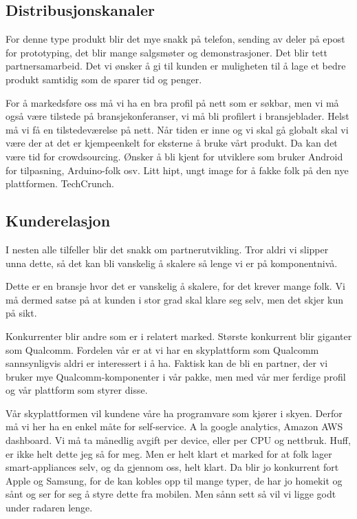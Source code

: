 
\subsection{Distribusjonskanaler}

For denne type produkt blir det mye snakk på telefon, sending av deler på epost
for prototyping, det blir mange salgsmøter og demonstrasjoner. Det blir tett
partnersamarbeid. Det vi ønsker å gi til kunden er muligheten til å lage et
bedre produkt samtidig som de sparer tid og penger.

For å markedsføre oss må vi ha en bra profil på nett som er søkbar, men vi må
også være tilstede på bransjekonferanser, vi må bli profilert i bransjeblader.
Helst må vi få en tilstedeværelse på nett. Når tiden er inne og vi skal gå
globalt skal vi være der at det er kjempeenkelt for eksterne å bruke vårt
produkt. Da kan det være tid for crowdsourcing. Ønsker å bli kjent for
utviklere som bruker Android for tilpasning, Arduino-folk osv. Litt hipt, ungt
image for å fakke folk på den nye plattformen. TechCrunch.

\subsection{Kunderelasjon}

I nesten alle tilfeller blir det snakk om partnerutvikling. Tror aldri vi
slipper unna dette, så det kan bli vanskelig å skalere så lenge vi er på
komponentnivå.

Dette er en bransje hvor det er vanskelig å skalere, for det krever mange folk.
Vi må dermed satse på at kunden i stor grad skal klare seg selv, men det skjer
kun på sikt.

Konkurrenter blir andre som er i relatert marked. Største konkurrent blir
giganter som Qualcomm. Fordelen vår er at vi har en skyplattform som Qualcomm
sannsynligvis aldri er interessert i å ha. Faktisk kan de bli en partner, der
vi bruker mye Qualcomm-komponenter i vår pakke, men med vår mer ferdige profil
og vår plattform som styrer disse.

Vår skyplattformen vil kundene våre ha programvare som kjører i skyen. Derfor
må vi her ha en enkel måte for self-service. A la google analytics, Amazon AWS
dashboard. Vi må ta månedlig avgift per device, eller per CPU og nettbruk.
Huff, er ikke helt dette jeg så for meg. Men er helt klart et marked for at
folk lager smart-appliances selv, og da gjennom oss, helt klart. Da blir jo
konkurrent fort Apple og Samsung, for de kan kobles opp til mange typer, de har
jo homekit og sånt og ser for seg å styre dette fra mobilen.
Men sånn sett så vil vi ligge godt under radaren lenge.
